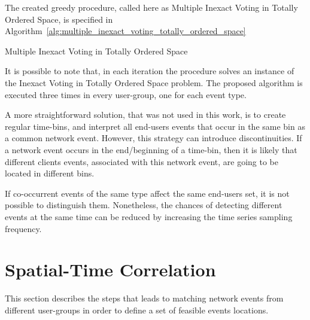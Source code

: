 The created greedy procedure, called here as Multiple Inexact Voting in Totally
Ordered Space, is specified in
Algorithm~\ref{alg:multiple_inexact_voting_totally_ordered_space}

\begin{algorithm}[H]
\caption{Multiple Inexact Voting in Totally Ordered Space}
\label{alg:multiple_inexact_voting_totally_ordered_space}
    \begin{algorithmic}[1]
        \EndWhile{}
    \end{algorithmic}
\end{algorithm}

It is possible to note that, in each iteration the procedure solves an instance
of the Inexact Voting in Totally Ordered Space problem.
The proposed algorithm is executed three times in every user-group,
one for each event type.

A more straightforward solution, that was not used in this work, is to create
regular time-bins, and interpret all end-users events that occur in the same
bin as a common network event.
However, this strategy can introduce
discontinuities. If a network event occurs in the end/beginning of a time-bin,
then it is likely that different clients events, associated with this
network event, are going to be located in different bins.

If co-occurrent events of the same type affect the same end-users set,
it is not possible to distinguish them. Nonetheless, the chances of
detecting different events at the same time can be reduced by increasing
the time series sampling frequency.

\section{Spatial-Time Correlation}
\label{sec:spatial_time_correlation}

This section describes the steps that leads to matching
network events from different user-groups in order to define
a set of feasible events locations.

